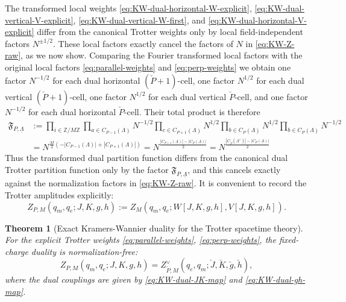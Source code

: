 \documentclass[dvipsnames,a4paper]{article}
\numberwithin{equation}{section}
\newtheorem{theorem}{Theorem}[section]
\theoremstyle{definition}
\theoremstyle{remark}
\begin{document}
The transformed local weights \eqref{eq:KW-dual-horizontal-W-explicit},
\eqref{eq:KW-dual-vertical-V-explicit}, \eqref{eq:KW-dual-vertical-W-first}, and
\eqref{eq:KW-dual-horizontal-V-explicit} differ from the canonical Trotter weights only by
local field-independent factors \(N^{\pm 1/2}\). These local factors exactly cancel the factors of $N$ in \eqref{eq:KW-Z-raw}, as we now show. Comparing the
Fourier transformed local factors with the original local factors
\eqref{eq:parallel-weights} and \eqref{eq:perp-weights} we obtain one factor \(N^{-1/2}\)
for each dual horizontal \((\check P+1)\)-cell, one factor \(N^{1/2}\) for each dual
vertical \((\check P+1)\)-cell, one factor \(N^{1/2}\) for each dual vertical
\(\check P\)-cell, and one factor \(N^{-1/2}\) for each dual horizontal \(\check P\)-cell.
Their total product is therefore
\begin{equation}
	\begin{aligned}
		\mathfrak F_{P,\underline\Lambda}
		&:=
		\prod_{i\in \mathbb Z/M\mathbb Z}
		\prod_{a\in C_{P-1}(\Lambda)}N^{-1/2}
		\prod_{c\in C_{P+1}(\Lambda)}N^{1/2}
		\prod_{b\in C_P(\Lambda)}N^{1/2}
		\prod_{b\in C_P(\Lambda)}N^{-1/2}
		\\
		&=
		N^{\frac{M}{2}\left(-|C_{P-1}(\Lambda)|+|C_{P+1}(\Lambda)|\right)}
		=
		N^{\frac{|C_{P+1}(\underline\Lambda)|-|C_P(\underline\Lambda)|}{2}}
		=
		N^{\frac{|C_{\check P}(\underline\Lambda^\vee)|-|C_P(\underline\Lambda)|}{2}}
	\end{aligned}
	\label{eq:KW-local-factor-product}
\end{equation}
Thus the transformed dual partition function differs from the canonical dual Trotter
partition function only by the factor \(\mathfrak F_{P,\underline\Lambda}\), and this
cancels exactly against the normalization factors in
\eqref{eq:KW-Z-raw}. It is convenient to record the Trotter amplitudes explicitly:
\begin{equation}
	Z_{P,M}(q_m,q_e;J,K,g,h)
	:=
	Z_M(q_m,q_e;W[J,K,g,h],V[J,K,g,h]).
	\label{eq:KW-Trotter-fixed-charge-def}
\end{equation}

\begin{theorem}[Exact Kramers-Wannier duality for the Trotter spacetime theory]
	\label{thm:KW-Trotter-duality}
	For the explicit Trotter weights \eqref{eq:parallel-weights}, \eqref{eq:perp-weights}, the
	fixed-charge duality is normalization-free:
	\begin{equation}
		Z_{P,M}(q_m,q_e;J,K,g,h)
		=
		Z_{\check P,M}^\vee(q_e,q_m;\check J,\check K,\check g,\check h),
		\label{eq:KW-Trotter-fixed-charge-duality}
	\end{equation}
	where the dual couplings are given by \eqref{eq:KW-dual-JK-map} and
	\eqref{eq:KW-dual-gh-map}.
\end{theorem}
\end{document}
